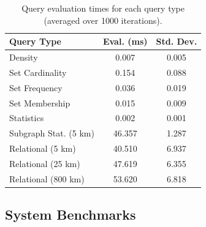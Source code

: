 \begin{table}[h!]
    \renewcommand{\arraystretch}{1.3}
    \caption{Query evaluation times for each query type (averaged over 1000 iterations).}
    \label{tbl:query-times}
    \begin{center}
        \begin{tabular}{|l|c|c|}
            \hline
            \textbf{Query Type}      & \textbf{Eval. (ms)} & \textbf{Std. Dev.} \\
            \hline
            Density                  & 0.007                    & 0.005 \\
            \hline
            Set Cardinality          & 0.154                    & 0.088 \\
            \hline
            Set Frequency            & 0.036                    & 0.019 \\
            \hline
            Set Membership           & 0.015                    & 0.009 \\
            \hline
            Statistics               & 0.002                    & 0.001 \\
            \hline
            \hline
            Subgraph Stat. (5 km)    & 46.357                   & 1.287 \\
            \hline
            Relational (5 km)        & 40.510                   & 6.937 \\
            \hline
            Relational (25 km)       & 47.619                   & 6.355 \\
            \hline
            Relational (800 km)      & 53.620                   & 6.818 \\
            \hline
        \end{tabular}
    \end{center}
\end{table}



\subsection{System Benchmarks}

